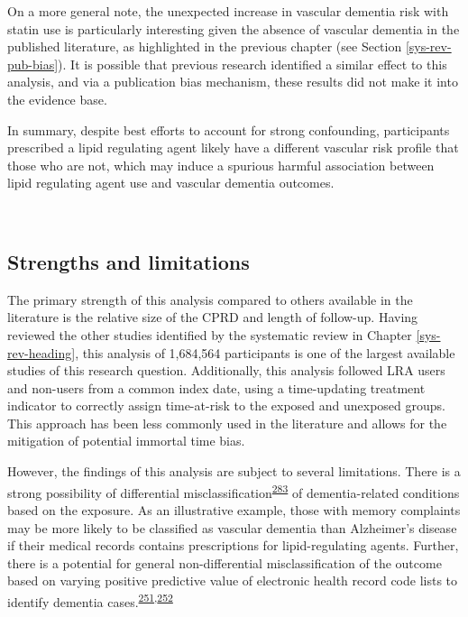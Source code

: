 \documentclass[a4paper, twoside]{templates/ociamthesis}
\begin{document}
On a more general note, the unexpected increase in vascular dementia risk with statin use is particularly interesting given the absence of vascular dementia in the published literature, as highlighted in the previous chapter (see Section \ref{sys-rev-pub-bias}). It is possible that previous research identified a similar effect to this analysis, and via a publication bias mechanism, these results did not make it into the evidence base.

In summary, despite best efforts to account for strong confounding, participants prescribed a lipid regulating agent likely have a different vascular risk profile that those who are not, which may induce a spurious harmful association between lipid regulating agent use and vascular dementia outcomes.

~

\hypertarget{strengths-and-limitations-1}{%
\subsection{Strengths and limitations}\label{strengths-and-limitations-1}}

The primary strength of this analysis compared to others available in the literature is the relative size of the CPRD and length of follow-up. Having reviewed the other studies identified by the systematic review in Chapter \ref{sys-rev-heading}, this analysis of 1,684,564 participants is one of the largest available studies of this research question. Additionally, this analysis followed LRA users and non-users from a common index date, using a time-updating treatment indicator to correctly assign time-at-risk to the exposed and unexposed groups. This approach has been less commonly used in the literature and allows for the mitigation of potential immortal time bias.

However, the findings of this analysis are subject to several limitations. There is a strong possibility of differential misclassification\textsuperscript{\protect\hyperlink{ref-porta2014dictionary}{283}} of dementia-related conditions based on the exposure. As an illustrative example, those with memory complaints may be more likely to be classified as vascular dementia than Alzheimer's disease if their medical records contains prescriptions for lipid-regulating agents. Further, there is a potential for general non-differential misclassification of the outcome based on varying positive predictive value of electronic health record code lists to identify dementia cases.\textsuperscript{\protect\hyperlink{ref-mcguinness2019validity}{251},\protect\hyperlink{ref-wilkinson2018}{252}}
\end{document}
